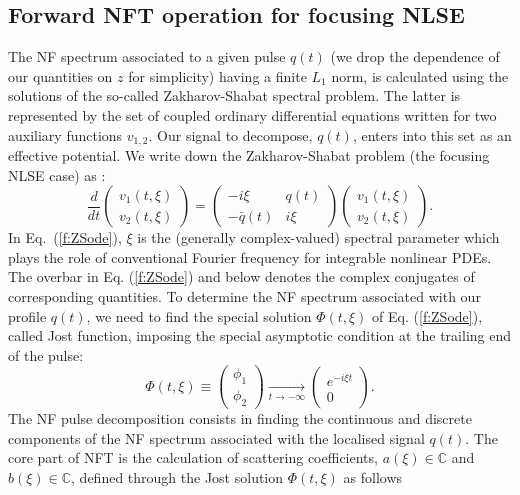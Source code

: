 \subsection*{Forward NFT operation for focusing NLSE}
The NF spectrum associated to a given pulse $q(t)$ (we drop the dependence of our quantities on $z$ for simplicity) having a finite $L_1$ norm, is calculated using the solutions of the so-called Zakharov-Shabat spectral problem\cite{zs72,tplwfkd17,nmp84,yk14-1}. The latter is represented by the set of coupled ordinary differential equations written for two auxiliary functions $v_{1,2}$. Our signal to decompose, $q(t)$, enters into this set as an effective potential. We write down the Zakharov-Shabat problem (the focusing NLSE case) as \cite{zs72}:
\begin{equation}
\frac{d}{dt}
\left(\begin{matrix}v_1(t, \xi)\\ v_2(t, \xi)\end{matrix}\right)
=\left(\begin{matrix}-i\xi&q(t)\\ -\bar{q}(t)&i\xi\end{matrix}\right)
\left(\begin{matrix}v_1(t, \xi)\\ v_2(t, \xi)\end{matrix}\right).
\label{f:ZSode}
\end{equation}
In Eq.~(\ref{f:ZSode}),  $\xi$ is the (generally complex-valued) spectral parameter which plays the role of conventional Fourier frequency for integrable nonlinear PDEs. The overbar in Eq. (\ref{f:ZSode}) and below denotes the complex conjugates of corresponding quantities. To determine the NF spectrum associated with our profile $q(t)$, we need to find the special solution  $\Phi(t,\xi)$ of Eq. (\ref{f:ZSode}), called Jost function, imposing the special asymptotic condition at the trailing end of the pulse:
\begin{equation}
\Phi(t,\xi)\equiv\left(\begin{matrix}\phi_1\\ \phi_2\end{matrix}\right)
\xrightarrow[t\rightarrow-\infty]{} \left(\begin{matrix}e^{-i\xi t}\\ 0\end{matrix}\right).
\label{f:asy}
\end{equation}
The NF pulse decomposition consists in finding the continuous and discrete components of the NF spectrum associated with the localised signal $q(t)$. The core part of NFT is the calculation of scattering coefficients, $a(\xi) \in \mathbb{C}$ and $b(\xi) \in \mathbb{C}$, defined through the Jost solution $\Phi(t,\xi)$ as follows
